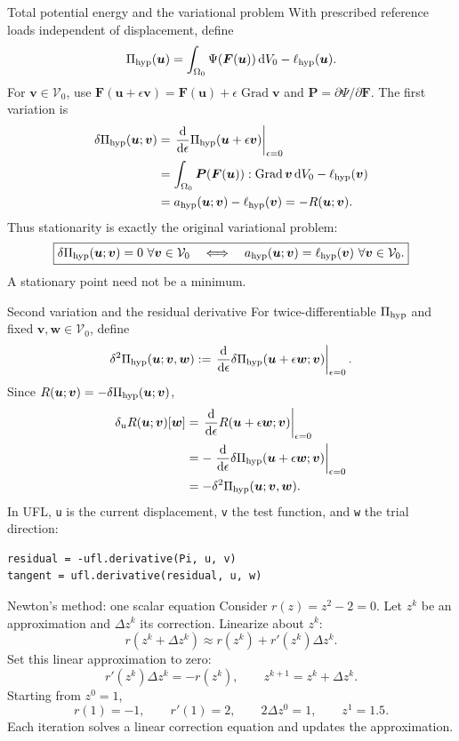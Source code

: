 \documentclass[11pt,aspectratio=169]{beamer}
\newcommand{\bu}{\bm u}
\newcommand{\bv}{\bm v}
\newcommand{\bw}{\bm w}
\newcommand{\bF}{\bm F}
\newcommand{\bP}{\bm P}
\newcommand{\Grad}{\operatorname{Grad}}
\newcommand{\Vzero}{\mathcal V_0}
\begin{document}
\begin{frame}{Total potential energy and the variational problem}
With prescribed reference loads independent of displacement, define
\[
\Pi_{\rm hyp}(\bu)
=\int_{\Omega_0}\Psi(\bF(\bu))\,\mathrm dV_0
-\ell_{\rm hyp}(\bu).
\]
For $\bv\in\Vzero$, use
$\bF(\bu+\epsilon\bv)=\bF(\bu)+\epsilon\Grad\bv$ and
$\bP=\partial\Psi/\partial\bF$. The first variation is
\[
\begin{aligned}
\delta\Pi_{\rm hyp}(\bu;\bv)
&=\left.\frac{\mathrm d}{\mathrm d\epsilon}
\Pi_{\rm hyp}(\bu+\epsilon\bv)\right|_{\epsilon=0}\\
&=\int_{\Omega_0}\bP(\bF(\bu)):\Grad\bv\,\mathrm dV_0
-\ell_{\rm hyp}(\bv)\\
&=a_{\rm hyp}(\bu;\bv)-\ell_{\rm hyp}(\bv)=-R(\bu;\bv).
\end{aligned}
\]
Thus stationarity is exactly the original variational problem:
\[
\boxed{\delta\Pi_{\rm hyp}(\bu;\bv)=0\ \forall\bv\in\Vzero
\quad\Longleftrightarrow\quad
a_{\rm hyp}(\bu;\bv)=\ell_{\rm hyp}(\bv)\ \forall\bv\in\Vzero.}
\]
A stationary point need not be a minimum.
\end{frame}

\begin{frame}[fragile]{Second variation and the residual derivative}
For twice-differentiable $\Pi_{\rm hyp}$ and fixed $\bv,\bw\in\Vzero$, define
\[
\delta^2\Pi_{\rm hyp}(\bu;\bv,\bw)
:=\left.\frac{\mathrm d}{\mathrm d\epsilon}
\delta\Pi_{\rm hyp}(\bu+\epsilon\bw;\bv)\right|_{\epsilon=0}.
\]
Since $R(\bu;\bv)=-\delta\Pi_{\rm hyp}(\bu;\bv)$,
\[
\begin{aligned}
\delta_uR(\bu;\bv)[\bw]
&=\left.\frac{\mathrm d}{\mathrm d\epsilon}
R(\bu+\epsilon\bw;\bv)\right|_{\epsilon=0}\\
&=-\left.\frac{\mathrm d}{\mathrm d\epsilon}
\delta\Pi_{\rm hyp}(\bu+\epsilon\bw;\bv)\right|_{\epsilon=0}\\
&=-\delta^2\Pi_{\rm hyp}(\bu;\bv,\bw).
\end{aligned}
\]
In UFL, \texttt{u} is the current displacement, \texttt{v} the test
function, and \texttt{w} the trial direction:
\begin{verbatim}
residual = -ufl.derivative(Pi, u, v)
tangent = ufl.derivative(residual, u, w)
\end{verbatim}
\end{frame}

\begin{frame}{Newton's method: one scalar equation}
Consider $r(z)=z^2-2=0$. Let $z^k$ be an approximation and
$\Delta z^k$ its correction.
Linearize about $z^k$:
\[
r(z^k+\Delta z^k)
\approx r(z^k)+r'(z^k)\Delta z^k.
\]
Set this linear approximation to zero:
\[
\boxed{r'(z^k)\Delta z^k=-r(z^k),\qquad
z^{k+1}=z^k+\Delta z^k.}
\]
Starting from $z^0=1$,
\[
r(1)=-1,\qquad r'(1)=2,\qquad
2\Delta z^0=1,\qquad z^1=1.5.
\]
Each iteration solves a linear correction equation and updates the approximation.
\end{frame}
\end{document}
